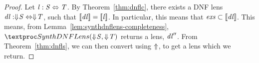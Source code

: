 \documentclass[acmsmall]{acmart}
\begin{document}
\algc
\begin{proof}
  Let $\mathit{l} : \mathit{S} \Leftrightarrow \mathit{T}$.  By
  Theorem~\ref{thm:dnflc}, there exists a DNF lens $\mathit{dl} : \Downarrow\mkern-4mu \mathit{S}
  \Leftrightarrow \Downarrow\mkern-4mu \mathit{T}$, such that $[ \! [\mathit{dl}] \! ] =
  [ \! [\mathit{l}] \! ]$.  In particular, this means that $\mathit{exs} \subset
  [ \! [\mathit{dl}] \! ]$.  This means, from
  Lemma~\ref{lem:synthdnflens-completeness},
  $\SynthDNFLens(\ToDNFRegexOf{\Regex},\ToDNFRegexOf{\RegexAlt})$ returns a
  lens, $\mathit{dl}''$.  From Theorem~\ref{thm:dnfls}, we can then convert using
  $\Uparrow$, to get a lens which we return.
\end{proof}

%
\end{document}
